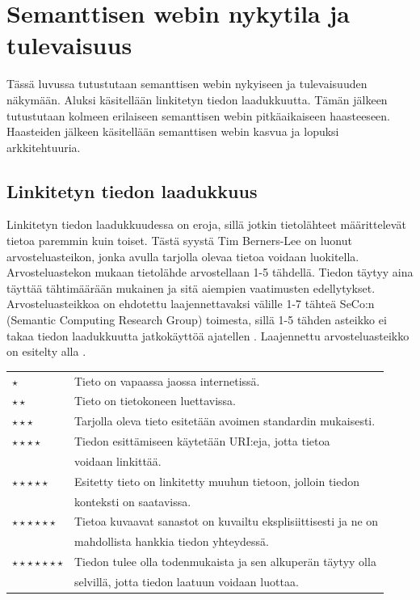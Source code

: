 \documentclass[finnish, 12pt, a4paper, elec, utf8, pdfa, online]{aaltothesis}
\begin{document}
{\section{Semanttisen webin nykytila ja tulevaisuus}
Tässä luvussa tutustutaan semanttisen webin nykyiseen ja tulevaisuuden näkymään. Aluksi käsitellään linkitetyn tiedon laadukkuutta. Tämän jälkeen tutustutaan kolmeen erilaiseen semanttisen webin pitkäaikaiseen haasteeseen. Haasteiden jälkeen käsitellään semanttisen webin kasvua ja lopuksi arkkitehtuuria.

\subsection{Linkitetyn tiedon laadukkuus}
\enlargethispage{1\baselineskip}
Linkitetyn tiedon laadukkuudessa on eroja, sillä jotkin tietolähteet määrittelevät tietoa paremmin kuin toiset. Tästä syystä Tim Berners-Lee on luonut arvosteluasteikon, jonka avulla tarjolla olevaa tietoa voidaan luokitella. Arvosteluastekon mukaan tietolähde arvostellaan 1-5 tähdellä. Tiedon täytyy aina täyttää tähtimäärään mukainen ja sitä aiempien vaatimusten edellytykset. Arvosteluasteikkoa on ehdotettu laajennettavaksi välille 1-7 tähteä SeCo:n (Semantic Computing Research Group) toimesta, sillä 1-5 tähden asteikko ei takaa tiedon laadukkuutta jatkokäyttöä ajatellen \cite{SeCo_stars}. Laajennettu arvosteluasteikko on esitelty alla \cite{SeCo_stars} \cite{SeCo_stars2} \cite{Tim-BL}.

\begin{tabular}{ll}
\vspace*{0.2cm}
$\star$                     & Tieto on vapaassa jaossa internetissä. \\
\vspace*{0.2cm}
$\star \star$                & Tieto on tietokoneen luettavissa. \\
\vspace*{0.2cm}
$\star\star\star$           & Tarjolla oleva tieto esitetään avoimen standardin mukaisesti. \\

$\star\star\star\star$      & Tiedon esittämiseen käytetään URI:eja, jotta tietoa \\
\vspace*{0.2cm}             & voidaan linkittää. \\
$\star\star\star\star\star$ & Esitetty tieto on linkitetty muuhun tietoon, jolloin tiedon \\        \vspace*{0.5cm}             & konteksti on saatavissa. \\
$\star\star\star\star\star\star$     & Tietoa kuvaavat sanastot on kuvailtu eksplisiittisesti ja ne on\\   \vspace*{0.2cm}               & mahdollista hankkia tiedon yhteydessä. \\
$\star\star\star\star\star\star\star$   & Tiedon tulee olla todenmukaista ja sen alkuperän täytyy olla  \\   &selvillä, jotta tiedon laatuun voidaan luottaa. \\ %
\end{tabular}

}
\end{document}
